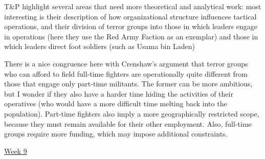\documentclass{article}[12pt]
\begin{document}
T\&P highlight several areas that need more theoretical and analytical work:  most interesting is their description of how organizational structure influences tactical operations, and their division of terror groups into those in which leaders engage in operations (here they use the Red Army Faction as an  exemplar) and those in which leaders direct foot soldiers (such as Usama bin Laden)

There is a nice congruence here with Crenshaw’s argument that terror groups who can afford to field full-time fighters are operationally quite different from those that engage only part-time militants. The former can be more ambitious, but I wonder if they also have a harder time hiding the activities of their operatives (who would have a more difficult time melting back into the population).  Part-time fighters also imply a more geographically restricted 
scope, because they must remain available for their other employment. Also, full-time groups require more funding, which may impose additional constraints.

\underline{Week 9}
\end{document}
